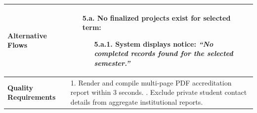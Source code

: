 \begin{table}[H]
\begin{tabularx}{\textwidth}{|l|X|}
\textbf{Alternative Flows} &
\begin{itemize}[leftmargin=*]
    \item[\textbf{5.a.}] \textbf{No finalized projects exist for selected term:}
    \begin{itemize}[leftmargin=*]
        \item[5.a.1.] System displays notice: \textit{``No completed records found for the selected semester.''}
    \end{itemize}
\end{itemize} \\ \hline
\textbf{Quality Requirements} & 
1. Render and compile multi-page PDF accreditation report within 3 seconds. \newline
2. Exclude private student contact details from aggregate institutional reports. \\ \hline
\end{tabularx}
\end{table}
